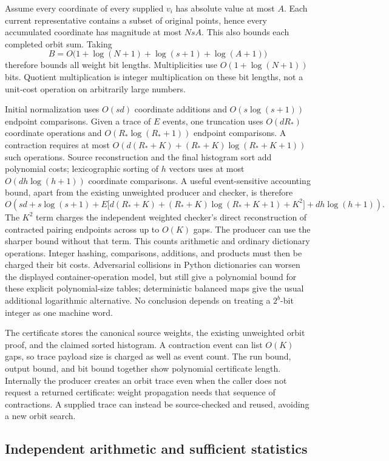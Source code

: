 Assume every coordinate of every supplied $v_i$ has absolute value at most
$A$. Each current representative contains a subset of original points, hence
every accumulated coordinate has magnitude at most $NsA$. This also bounds
each completed orbit sum. Taking
\[
 B=O\bigl(1+\log(N+1)+\log(s+1)+\log(A+1)\bigr)
\]
therefore bounds all weight bit lengths. Multiplicities use
$O(1+\log(N+1))$ bits. Quotient multiplication is integer multiplication on
these bit lengths, not a unit-cost operation on arbitrarily large numbers.

Initial normalization uses $O(sd)$ coordinate additions and $O(s\log(s+1))$
endpoint comparisons. Given a trace of $E$ events, one truncation uses
$O(dR_*)$ coordinate operations and $O(R_*\log(R_*+1))$ endpoint comparisons.
A contraction requires at most
$O(d(R_*+K)+(R_*+K)\log(R_*+K+1))$ such operations. Source reconstruction and
the final histogram sort add polynomial costs; lexicographic sorting of $h$
vectors uses at most $O(dh\log(h+1))$ coordinate comparisons. A useful
event-sensitive accounting bound, apart from the existing unweighted
producer and checker, is therefore
\[
 O\!\left(sd+s\log(s+1)
 +E\bigl[d(R_*+K)+(R_*+K)\log(R_*+K+1)+K^2\bigr]
 +dh\log(h+1)\right).
\]
The $K^2$ term charges the independent weighted checker's direct reconstruction of contracted pairing endpoints across up to $O(K)$ gaps. The producer can use the sharper bound without that term. This counts arithmetic and ordinary dictionary operations. Integer hashing,
comparisons, additions, and products must then be charged their bit costs.
Adversarial collisions in Python dictionaries can worsen the displayed
container-operation model, but still give a polynomial bound for these
explicit polynomial-size tables; deterministic balanced maps give the usual
additional logarithmic alternative. No conclusion depends on treating a
$2^b$-bit integer as one machine word.

The certificate stores the canonical source weights, the existing unweighted
orbit proof, and the claimed sorted histogram. A contraction event can list
$O(K)$ gaps, so trace payload size is charged as well as event count. The run
bound, output bound, and bit bound together show polynomial certificate
length. Internally the producer creates an orbit trace even when the caller
does not request a returned certificate: weight propagation needs that
sequence of contractions. A supplied trace can instead be source-checked and
reused, avoiding a new orbit search.

\subsection{Independent arithmetic and sufficient statistics}

